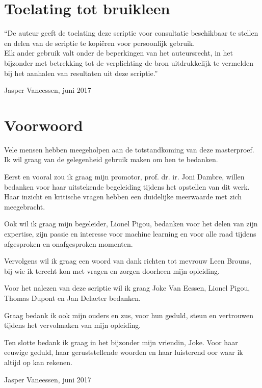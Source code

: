 
\chapter*{Toelating tot bruikleen}

\vspace{1.5cm}

\noindent
``De auteur geeft de toelating deze scriptie voor consultatie beschikbaar
te stellen en delen van de scriptie te kopi\"eren voor persoonlijk
gebruik.\\
Elk ander gebruik valt onder de beperkingen van het auteursrecht,
in het bijzonder met betrekking tot de verplichting de bron uitdrukkelijk
te vermelden bij het aanhalen van resultaten uit deze scriptie.''

\addvspace{4cm}

\noindent Jasper Vaneessen, juni 2017

\chapter{Voorwoord}

\begin{slshape}
\renewcommand{\baselinestretch}{1.2}
\small\normalsize

Vele mensen hebben meegeholpen aan de totstandkoming van deze masterproef. Ik wil graag van de gelegenheid gebruik maken om hen te bedanken.

\npar Eerst en vooral zou ik graag mijn promotor, prof. dr. ir. Joni Dambre, willen bedanken voor haar uitstekende begeleiding tijdens het opstellen van dit werk. Haar inzicht en kritische vragen hebben een duidelijke meerwaarde met zich meegebracht.

\npar Ook wil ik graag mijn begeleider, Lionel Pigou, bedanken voor het delen van zijn expertise, zijn passie en interesse voor machine learning en voor alle raad tijdens afgesproken en onafgesproken momenten. 

\npar Vervolgens wil ik graag een woord van dank richten tot mevrouw Leen Brouns, bij wie ik terecht kon met vragen en zorgen doorheen mijn opleiding.

\npar Voor het nalezen van deze scriptie wil ik graag Joke Van Eessen, Lionel Pigou, Thomas Dupont en Jan Delaeter bedanken.

\npar Graag bedank ik ook mijn ouders en zus, voor hun geduld, steun en vertrouwen tijdens het vervolmaken van mijn opleiding. 

\npar Ten slotte bedank ik graag in het bijzonder mijn vriendin, Joke. Voor haar eeuwige geduld, haar geruststellende woorden en haar luisterend oor waar ik altijd op kan rekenen.


\addvspace{4cm}

\noindent Jasper Vaneessen, juni 2017
\end{slshape}

